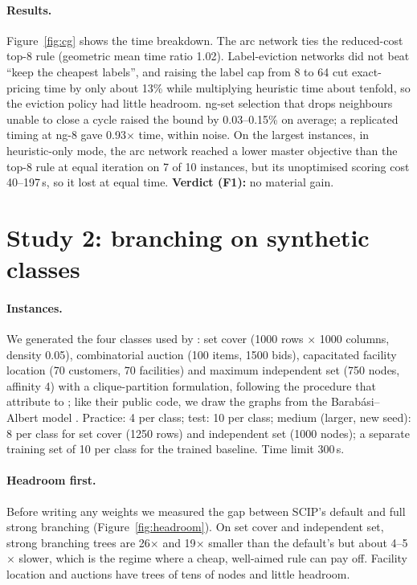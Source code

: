 \documentclass[11pt]{article}
\begin{document}
\paragraph{Results.} Figure~\ref{fig:cg} shows the time breakdown. The arc network ties the
reduced-cost top-8 rule (geometric mean time ratio 1.02). Label-eviction networks did not beat
``keep the cheapest labels'', and raising the label cap from 8 to 64 cut exact-pricing time by
only about 13\% while multiplying heuristic time about tenfold, so the eviction policy had little
headroom. ng-set selection that drops neighbours unable to close a cycle raised the bound by
0.03--0.15\% on average; a replicated timing at ng-8 gave 0.93$\times$ time, within noise. On the
largest instances, in heuristic-only mode, the arc network reached a lower master objective than
the top-8 rule at equal iteration on 7 of 10 instances, but its unoptimised scoring cost
40--197\,s, so it lost at equal time. \textbf{Verdict (F1):} no material gain.

\section{Study 2: branching on synthetic classes}
\label{sec:syn}

\paragraph{Instances.} We generated the four classes used by \citet{gasse2019}: set cover
\citep{balas1980} (1000 rows $\times$ 1000 columns, density 0.05), combinatorial auction
\citep{leytonbrown2000} (100 items, 1500 bids), capacitated facility location
\citep{cornuejols1991} (70 customers, 70 facilities) and maximum independent set (750 nodes, affinity 4) with a clique-partition
formulation, following the procedure that \citet{gasse2019} attribute to \citet{bergman2016};
like their public code, we draw the graphs from the Barabási--Albert model \citep{barabasi1999}. Practice: 4 per class; test: 10 per class; medium (larger, new
seed): 8 per class for set cover (1250 rows) and independent set (1000 nodes); a separate training
set of 10 per class for the trained baseline. Time limit 300\,s.

\paragraph{Headroom first.} Before writing any weights we measured the gap between SCIP's default
and full strong branching (Figure~\ref{fig:headroom}). On set cover and independent set, strong
branching trees are 26$\times$ and 19$\times$ smaller than the default's but about 4--5$\times$ slower,
which is the regime where a cheap, well-aimed rule can pay off. Facility location and auctions
have trees of tens of nodes and little headroom.
\end{document}
